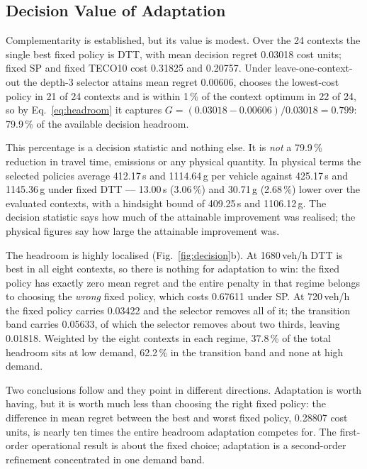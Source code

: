 \documentclass[runningheads]{llncs}
\begin{document}
\subsection{Decision Value of Adaptation}
\label{sec:value}

Complementarity is established, but its value is modest. Over the 24 contexts the single
best fixed policy is DTT, with mean decision regret 0.03018 cost units; fixed SP and
fixed TECO10 cost 0.31825 and 0.20757. Under leave-one-context-out the depth-3 selector
attains mean regret 0.00606, chooses the lowest-cost policy in 21 of 24 contexts and is
within 1\,\% of the context optimum in 22 of 24, so by Eq.~\eqref{eq:headroom} it captures
$G=(0.03018-0.00606)/0.03018=0.799$: 79.9\,\% of the available decision headroom.

This percentage is a decision statistic and nothing else. It is \emph{not} a 79.9\,\%
reduction in travel time, emissions or any physical quantity. In physical terms the
selected policies average 412.17\,s and 1114.64\,g per vehicle against 425.17\,s and
1145.36\,g under fixed DTT --- 13.00\,s (3.06\,\%) and 30.71\,g (2.68\,\%) lower over the
evaluated contexts, with a hindsight bound of 409.25\,s and 1106.12\,g. The decision
statistic says how much of the attainable improvement was realised; the physical figures
say how large the attainable improvement was.

The headroom is highly localised (Fig.~\ref{fig:decision}b). At 1680\,veh/h DTT is best
in all eight contexts, so there is nothing for adaptation to win: the fixed policy has
exactly zero mean regret and the entire penalty in that regime belongs to choosing the
\emph{wrong} fixed policy, which costs 0.67611 under SP. At 720\,veh/h the fixed policy
carries 0.03422 and the selector removes all of it; the transition band carries 0.05633,
of which the selector removes about two thirds, leaving 0.01818. Weighted by the eight
contexts in each regime, 37.8\,\% of the total headroom sits at low demand, 62.2\,\% in
the transition band and none at high demand.

Two conclusions follow and they point in different directions. Adaptation is worth having,
but it is worth much less than choosing the right fixed policy: the difference in mean
regret between the best and worst fixed policy, 0.28807 cost units, is nearly ten times
the entire headroom adaptation competes for. The first-order operational result is about
the fixed choice; adaptation is a second-order refinement concentrated in one demand
band.
\end{document}
